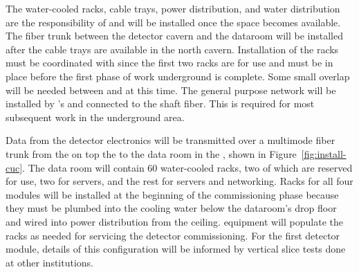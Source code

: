 The water-cooled racks, cable trays, power distribution, and water distribution are the responsibility of  and will be installed once the space becomes available. The  fiber trunk between the detector cavern and the  dataroom will be installed %
after the cable trays are available in the north cavern. Installation of the racks must be coordinated with  %
since the first two racks are for  use and must be in place before the first phase of %
work underground is complete. Some small overlap will be needed between  and  at this time. The general purpose network will be installed by 's  and connected to the shaft fiber. This is required for most %
subsequent work in the underground area.


Data from the detector electronics will be transmitted over a multimode fiber trunk from the  on top the  to the  data room in the , shown in Figure~\ref{fig:install-cuc}.  The data room will contain 60 water-cooled racks, two of which are reserved for  use, two for  servers, and the rest for  servers and networking. Racks for all four modules will be installed at the beginning of the  commissioning phase because they must be plumbed into the cooling water below the dataroom's drop floor and wired into power distribution from the ceiling.   equipment will populate the racks as needed for servicing the detector commissioning.  For the first detector module, details of this configuration will be informed by  vertical slice tests done at other institutions.  

